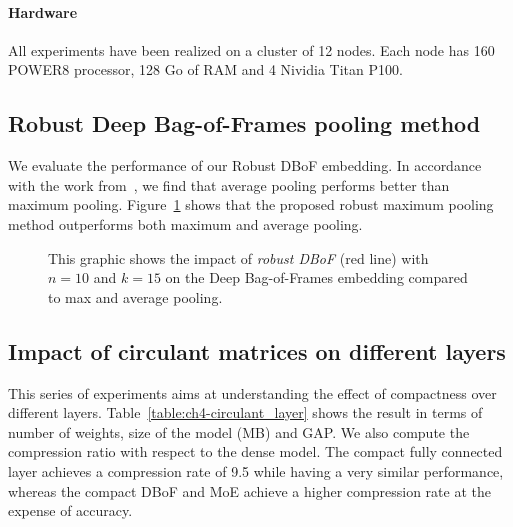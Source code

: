 \paragraph{Hardware}
All experiments have been realized on a cluster of 12 nodes. Each node has 160 POWER8 processor, 128 Go of RAM and 4 Nividia Titan P100.


\subsection{Robust Deep Bag-of-Frames pooling method}
\label{subsection:ch4-exp_bagging}

We evaluate the performance of our Robust DBoF embedding.
In accordance with the work from~\cite{abu2016youtube}, we find that average pooling performs better than maximum pooling. 
Figure~\ref{figure:ch4-learning_curve_bagging} shows that the proposed robust maximum pooling method outperforms both maximum and average pooling.

\begin{figure}[htb]
  \centering
  
  \caption{This graphic shows the impact of \emph{robust DBoF} (\ie red line) with $n=10$ and $k=15$ on the Deep Bag-of-Frames embedding compared to max and average pooling.}
  \label{figure:ch4-learning_curve_bagging}
\end{figure}

\subsection{Impact of circulant matrices on different layers}

This series of experiments aims at understanding the effect of compactness over different layers.
Table~\ref{table:ch4-circulant_layer} shows the result in terms of number of weights, size of the model (MB) and GAP.
We also compute the compression ratio with respect to the dense model.
The compact fully connected layer achieves a compression rate of 9.5 while having a very similar performance, whereas the compact DBoF and MoE achieve a higher compression rate at the expense of accuracy. 

